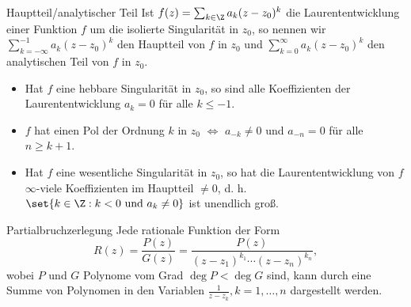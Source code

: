\begin{karte}{Hauptteil/analytischer Teil}
    Ist \(f(z) = \sum_{k\in\Z} a_k (z-z_0)^k\) die Laurententwicklung 
    einer Funktion \(f\) um die isolierte Singularität in \(z_0\), 
    so nennen wir \(\sum_{k=-\infty}^{-1}a_k (z-z_0)^k\) den Hauptteil 
    von \(f\) in \(z_0\) und \(\sum_{k=0}^\infty a_k (z-z_0)^k\) 
    den analytischen Teil von \(f\) in \(z_0\).\\
    \begin{itemize}
        \item Hat \(f\) eine hebbare Singularität in \(z_0\), so sind alle Koeffizienten 
        der Laurententwicklung \(a_k = 0\) für alle \(k \leq -1\).
        \item \(f\) hat einen Pol der Ordnung \(k\) in \(z_0\)
        \(\Leftrightarrow\) \(a_{-k} \neq 0\) und \(a_{-n} = 0\) für 
        alle \(n\geq k+1\).
        \item Hat \(f\) eine wesentliche Singularität in \(z_0\), 
        so hat die Laurententwicklung von \(f\) \(\infty\)-viele 
        Koeffizienten im Hauptteil \(\neq 0\), d. h. 
        \( \set{ k\in \Z: k<0 \text{ und } a_k \neq 0 } \) ist 
        unendlich groß.
    \end{itemize}
\end{karte}

\begin{karte}{Partialbruchzerlegung}
    Jede rationale Funktion der Form 
    \[ R(z) = \frac{P(z)}{G(z)} = \frac{P(z)}{(z - z_1)^{k_1} \cdots (z-z_n)^{k_n}}, \]
    wobei \(P\) und \(G\) Polynome vom Grad \(\deg P < \deg G\) sind, 
    kann durch eine Summe von Polynomen in den Variablen 
    \(\frac{1}{z-z_k}, k=1,\ldots, n\) dargestellt werden.
\end{karte}